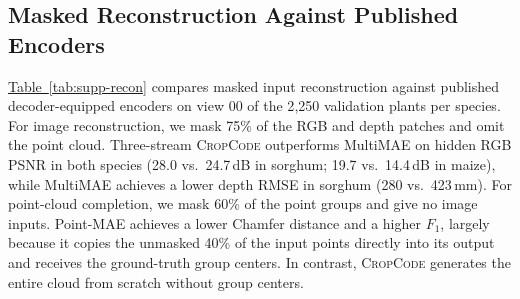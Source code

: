 \documentclass[10pt,twocolumn,letterpaper]{article}
\newcommand{\tabref}[1]{\hyperref[#1]{Table~\ref*{#1}}}
\newcommand{\method}{\textup{\textsc{CropCode}}}   %
\begin{document}
\subsection{Masked Reconstruction Against Published Encoders}
\label{sec:supp-recon}

\tabref{tab:supp-recon} compares masked input reconstruction against published decoder-equipped encoders on view 00 of the 2{,}250 validation plants per species. For image reconstruction, we mask 75\% of the RGB and depth patches and omit the point cloud. Three-stream \method{} outperforms MultiMAE on hidden RGB PSNR in both species (28.0 vs.\ 24.7\,dB in sorghum; 19.7 vs.\ 14.4\,dB in maize), while MultiMAE achieves a lower depth RMSE in sorghum (280 vs.\ 423\,mm). For point-cloud completion, we mask 60\% of the point groups and give no image inputs. Point-MAE achieves a lower Chamfer distance and a higher $F_1$, largely because it copies the unmasked 40\% of the input points directly into its output and receives the ground-truth group centers. In contrast, \method{} generates the entire cloud from scratch without group centers.
\end{document}
